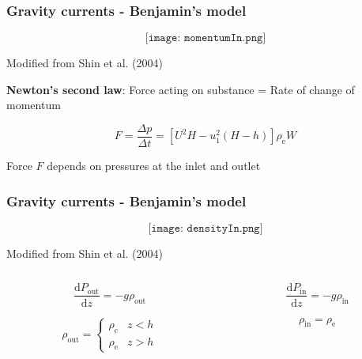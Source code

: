 \documentclass{beamer}
\begin{document}
\begin{frame}
  \frametitle{Gravity currents - Benjamin's model}

  $$\texttt{[image: momentumIn.png]}$$

  \vspace{-0.75cm}

  \begin{center}
  \tiny Modified from Shin et al. (2004)
  \end{center}

  \textbf{Newton's second law}: Force acting on substance = Rate of change of momentum

  $$ F = \frac{\Delta p}{\Delta t} = [U^{2} H - u_{1}^{2} (H - h)] \rho_{\text{e}} W $$

  Force $F$ depends on pressures at the inlet and outlet 
\end{frame}
\begin{frame}
  \frametitle{Gravity currents - Benjamin's model}

  $$\texttt{[image: densityIn.png]}$$

  \vspace{-0.75cm}

  \begin{center}
  \tiny Modified from Shin et al. (2004)
  \end{center}

  \begin{columns}[t]

    \begin{column}{0.5\paperwidth}

      $$ \frac{\mathrm{d} P_{\text{out}}}{\mathrm{d} z} = -g \rho_{\text{out}} $$

      $$ \rho_{\text{out}} = \begin{cases}
        \rho_{\text{c}} & z < h \\
        \rho_{\text{e}} & z > h
      \end{cases}
      $$
      
    \end{column}

    \begin{column}{0.5\paperwidth}

      $$ \frac{\mathrm{d} P_{\text{in}}}{\mathrm{d} z} = -g \rho_{\text{in}} $$

      $$ \rho_{\text{in}} = \rho_{\text{e}} $$
    \end{column}

  \end{columns}
\end{frame}
\end{document}
